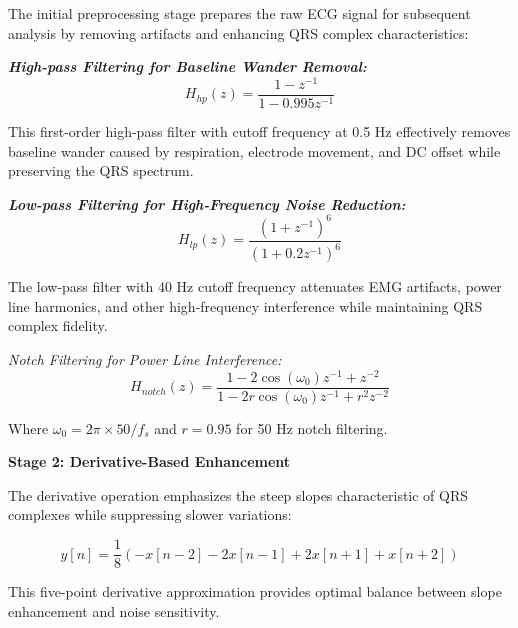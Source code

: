 \documentclass[12pt,a4paper]{article}
\begin{document}
The initial preprocessing stage prepares the raw ECG signal for subsequent analysis by removing artifacts and enhancing QRS complex characteristics:

\vspace{0.3cm}

\textit\textbf{{High-pass Filtering for Baseline Wander Removal:}}
\begin{equation*}
H_{hp}(z) = \frac{1 - z^{-1}}{1 - 0.995z^{-1}}
\end{equation*}

This first-order high-pass filter with cutoff frequency at 0.5 Hz effectively removes baseline wander caused by respiration, electrode movement, and DC offset while preserving the QRS spectrum.

\vspace{0.3cm}

\textit\textbf{{Low-pass Filtering for High-Frequency Noise Reduction:}}
\begin{equation*}
H_{lp}(z) = \frac{(1 + z^{-1})^6}{(1 + 0.2z^{-1})^6}
\end{equation*}

The low-pass filter with 40 Hz cutoff frequency attenuates EMG artifacts, power line harmonics, and other high-frequency interference while maintaining QRS complex fidelity.

\vspace{0.3cm}

\textit{Notch Filtering for Power Line Interference:}
\begin{equation*}
H_{notch}(z) = \frac{1 - 2\cos(\omega_0)z^{-1} + z^{-2}}{1 - 2r\cos(\omega_0)z^{-1} + r^2z^{-2}}
\end{equation*}

Where $\omega_0 = 2\pi \times 50/f_s$ and $r = 0.95$ for 50 Hz notch filtering.

\vspace{0.5cm}

\textbf{Stage 2: Derivative-Based Enhancement}

The derivative operation emphasizes the steep slopes characteristic of QRS complexes while suppressing slower variations:

\begin{equation*}
y[n] = \frac{1}{8}(-x[n-2] - 2x[n-1] + 2x[n+1] + x[n+2])
\end{equation*}

This five-point derivative approximation provides optimal balance between slope enhancement and noise sensitivity.
\end{document}
